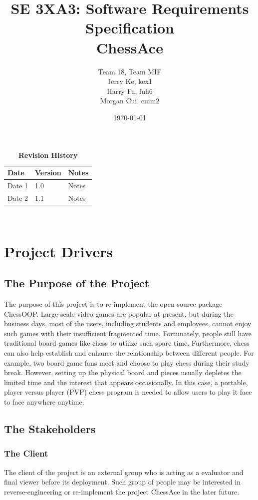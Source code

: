 \documentclass[12pt, titlepage]{article}
\title{SE 3XA3: Software Requirements Specification\\ChessAce}
\author{Team 18, Team MIF
		\\ Jerry Ke,  kex1
		\\ Harry Fu, fuh6
		\\ Morgan Cui, cuim2
}
\date{\today}
\begin{document}
\maketitle

\tableofcontents
\listoftables
\listoffigures

\begin{table}[bp]
\caption{\bf Revision History}
\begin{tabularx}{\textwidth}{p{3cm}p{2cm}X}
\toprule {\bf Date} & {\bf Version} & {\bf Notes}\\
\midrule
Date 1 & 1.0 & Notes\\
Date 2 & 1.1 & Notes\\
\bottomrule
\end{tabularx}
\end{table}

\newpage


~\citep{RobertsonAndRobertson2012}

\section{Project Drivers}

\subsection{The Purpose of the Project}
The purpose of this project is to re-implement the open source package ChessOOP. Large-scale video games are popular at present, but during the business days, most of the users, including students and employees, cannot enjoy such games with their insufficient fragmented time. Fortunately, people still have traditional board games like chess to utilize such spare time. Furthermore, chess can also help establish and enhance the relationship between different people. For example, two board game fans meet and choose to play chess during their study break. However, setting up the physical board and pieces usually depletes the limited time and the interest that appears occasionally. In this case, a portable, player versus player (PVP) chess program is needed to allow users to play it face to face anywhere anytime.

\subsection{The Stakeholders}

\subsubsection{The Client}
The client of the project is an external group who is acting as a evaluator and final viewer before its deployment. Such group of people may be interested in reverse-engineering or re-implement the project ChessAce in the later future.
\end{document}

